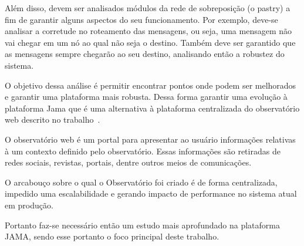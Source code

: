 Além disso, devem ser analisados módulos da rede de sobreposição (o pastry) a fim de garantir alguns aspectos do seu funcionamento. Por exemplo, deve-se analisar a corretude no roteamento das mensagens, ou seja, uma mensagem não vai chegar em um nó ao qual não seja o destino. Também deve ser garantido que as mensagens sempre chegarão ao seu destino, analisando então a robustez do sistema.

O objetivo dessa análise é permitir encontrar pontos onde podem ser melhorados e garantir uma plataforma mais robusta. Dessa forma garantir uma evolução à plataforma Jama que é uma alternativa à plataforma centralizada do observatório web descrito no trabalho~\cite{observatorio}.

O observatório web é um portal para apresentar ao usuário informações relativas à um contexto definido pelo observatório. Essas informações são retiradas de redes sociais, revistas, portais, dentre outros meios de comunicações.

O arcabouço sobre o qual o Observatório foi criado é de forma centralizada, impedido uma escalabilidade e gerando impacto de performance no sistema atual em produção.

Portanto faz-se necessário então um estudo mais aprofundado na plataforma JAMA, sendo esse portanto o foco principal deste trabalho.

























